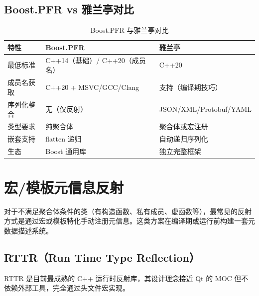 \documentclass[12pt,a4paper,fontset=fandol]{ctexbook}
\begin{document}
\subsection{Boost.PFR vs 雅兰亭对比}

\begin{table}[H]
\centering
\caption{Boost.PFR 与雅兰亭对比}
\begin{tabularx}{\textwidth}{lXX}
\toprule
\textbf{特性} & \textbf{Boost.PFR} & \textbf{雅兰亭} \\
\midrule
最低标准 & C++14（基础）/ C++20（成员名） & C++20 \\
成员名获取 & C++20 + MSVC/GCC/Clang & 支持（编译期技巧） \\
序列化整合 & 无（仅反射） & JSON/XML/Protobuf/YAML \\
类型要求 & 纯聚合体 & 聚合体或宏注册 \\
嵌套支持 & flatten 递归 & 自动递归序列化 \\
生态 & Boost 通用库 & 独立完整框架 \\
\bottomrule
\end{tabularx}
\end{table}

\section{宏/模板元信息反射}\label{sec:macro}

对于不满足聚合体条件的类（有构造函数、私有成员、虚函数等），最常见的反射方式是通过宏或模板特化手动注册元信息。这类方案在编译期或运行前构建一套元数据描述系统。

\subsection{RTTR（Run Time Type Reflection）}\label{subsec:rttr}

RTTR 是目前最成熟的 C++ 运行时反射库，其设计理念接近 Qt 的 MOC 但不依赖外部工具，完全通过头文件宏实现。
\end{document}
